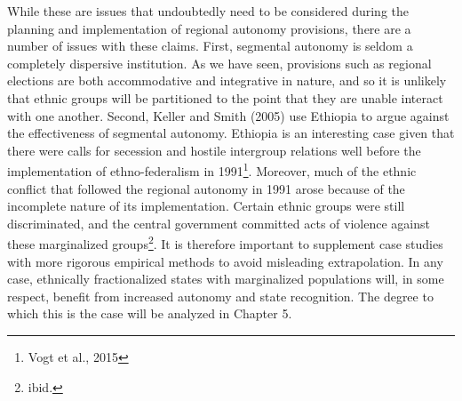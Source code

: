 \documentclass[12pt]{article}
\begin{document}
While these are issues that undoubtedly need to be considered during the planning and implementation of regional autonomy provisions, there are a number of issues with these claims. First, segmental autonomy is seldom a completely dispersive institution. As we have seen, provisions such as regional elections are both accommodative and integrative in nature, and so it is unlikely that ethnic groups will be partitioned to the point that they are unable interact with one another. Second, Keller and Smith (2005) use Ethiopia to argue against the effectiveness of segmental autonomy. Ethiopia is an interesting case given that there were calls for secession and hostile intergroup relations well before the implementation of ethno-federalism in 1991\footnote{Vogt et al., 2015}. Moreover, much of the ethnic conflict that followed the regional autonomy in 1991 arose because of the incomplete nature of its implementation. Certain ethnic groups were still discriminated, and the central government committed acts of violence against these marginalized groups\footnote{ibid.}. It is therefore important to supplement case studies with more rigorous empirical methods to avoid misleading extrapolation. In any case, ethnically fractionalized states with marginalized populations will, in some respect, benefit from increased autonomy and state recognition. The degree to which this is the case will be analyzed in Chapter 5.
\end{document}
